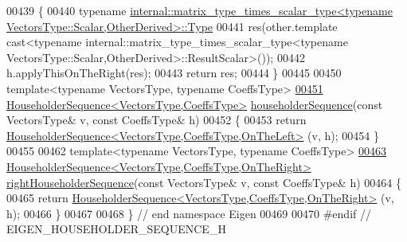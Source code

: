 \begin{DoxyCode}
00439 \{
00440   \textcolor{keyword}{typename} 
      \hyperlink{group___core___module_class_eigen_1_1_matrix}{internal::matrix\_type\_times\_scalar\_type<typename VectorsType::Scalar,OtherDerived>::Type}
00441     res(other.template cast<\textcolor{keyword}{typename} internal::matrix\_type\_times\_scalar\_type<typename
       VectorsType::Scalar,OtherDerived>::ResultScalar>());
00442   h.applyThisOnTheRight(res);
00443   \textcolor{keywordflow}{return} res;
00444 \}
00445 
00450 \textcolor{keyword}{template}<\textcolor{keyword}{typename} VectorsType, \textcolor{keyword}{typename} CoeffsType>
\hyperlink{group___householder___module_ga4bd4b85120e014cf1125a054b02d4d92}{00451} \hyperlink{group___householder___module_class_eigen_1_1_householder_sequence}{HouseholderSequence<VectorsType,CoeffsType>} 
      \hyperlink{group___householder___module_ga4bd4b85120e014cf1125a054b02d4d92}{householderSequence}(\textcolor{keyword}{const} VectorsType& v, \textcolor{keyword}{const} CoeffsType& h)
00452 \{
00453   \textcolor{keywordflow}{return} \hyperlink{group___householder___module_class_eigen_1_1_householder_sequence}{HouseholderSequence<VectorsType,CoeffsType,OnTheLeft>}
      (v, h);
00454 \}
00455 
00462 \textcolor{keyword}{template}<\textcolor{keyword}{typename} VectorsType, \textcolor{keyword}{typename} CoeffsType>
\hyperlink{group___householder___module_ga59f16274f9e66f902f1a4b3f23e8b002}{00463} \hyperlink{group___householder___module_class_eigen_1_1_householder_sequence}{HouseholderSequence<VectorsType,CoeffsType,OnTheRight>}
       \hyperlink{group___householder___module_ga59f16274f9e66f902f1a4b3f23e8b002}{rightHouseholderSequence}(\textcolor{keyword}{const} VectorsType& v, \textcolor{keyword}{const} CoeffsType& h)
00464 \{
00465   \textcolor{keywordflow}{return} \hyperlink{group___householder___module_class_eigen_1_1_householder_sequence}{HouseholderSequence<VectorsType,CoeffsType,OnTheRight>}
      (v, h);
00466 \}
00467 
00468 \} \textcolor{comment}{// end namespace Eigen}
00469 
00470 \textcolor{preprocessor}{#endif // EIGEN\_HOUSEHOLDER\_SEQUENCE\_H}
\end{DoxyCode}
